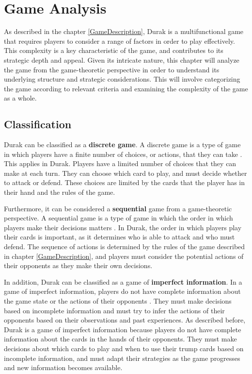 \chapter{Game Analysis}

As described in the chapter \ref{GameDescription}, Durak is a multifunctional game that requires players to consider a range of factors in order to play effectively. This complexity is a key characteristic of the game, and contributes to its strategic depth and appeal. Given its intricate nature, this chapter will analyze the game from the game-theoretic perspective in order to understand its underlying structure and strategic considerations. This will involve categorizing the game according to relevant criteria and examining the complexity of the game as a whole.

\section{Classification}

Durak can be classified as a \textbf{discrete game}. A discrete game is a type of game in which players have a finite number of choices, or actions, that they can take \citep{Gametheory4}. This applies in Durak. Players have a limited number of choices that they can make at each turn. They can choose which card to play, and must decide whether to attack or defend. These choices are limited by the cards that the player has in their hand and the rules of the game. 

Furthermore, it can be considered a \textbf{sequential} game from a game-theoretic perspective. A sequential game is a type of game in which the order in which players make their decisions matters \citep{Gametheory4}. In Durak, the order in which players play their cards is important, as it determines who is able to attack and who must defend. The sequence of actions is determined by the rules of the game described in chapter \ref{GameDescription}, and players must consider the potential actions of their opponents as they make their own decisions. 

In addition, Durak can be classified as a game of \textbf{imperfect information}. In a game of imperfect information, players do not have complete information about the game state or the actions of their opponents \citep{Gametheory4}. They must make decisions based on incomplete information and must try to infer the actions of their opponents based on their observations and past experiences. As described before, Durak is a game of imperfect information because players do not have complete information about the cards in the hands of their opponents. They must make decisions about which cards to play and when to use their trump cards based on incomplete information, and must adapt their strategies as the game progresses and new information becomes available.

